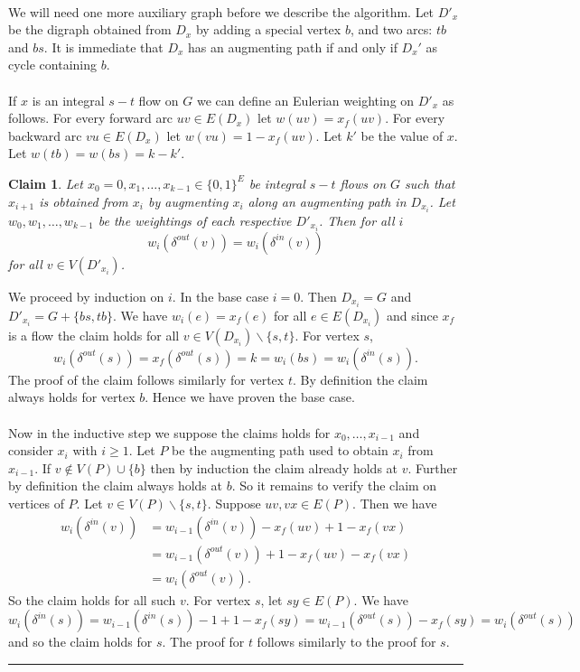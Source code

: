 \documentclass[letterpaper,12pt,oneside,onecolumn]{article}
\newenvironment{proof}{{\bf Proof:  }}{\hfill\rule{2mm}{2mm}}
\newtheorem{claim}[fact]{Claim}
\begin{document}
\paragraph{}
We will need one more auxiliary graph before we describe the algorithm. Let $D'_x$ be the digraph obtained from $D_x$ by adding a special vertex $b$, and two arcs: $tb$ and $bs$. It is immediate that $D_x$ has an augmenting path if and only if $D_x'$ as cycle containing $b$.
\paragraph{}
If $x$ is an integral $s-t$ flow on $G$ we can define an Eulerian weighting on $D'_x$ as follows. For every forward arc $uv \in E(D_x)$ let $w(uv) = x_f(uv)$. For every backward arc $vu \in E(D_x)$ let $w(vu) = 1- x_f(uv)$. Let $k'$ be the value of $x$. Let $w(tb) = w(bs) = k-k'$.
\begin{claim}
Let $x_0=0,x_1, \dots, x_{k-1}\in \{0,1\}^E$ be integral $s-t$ flows on $G$ such that $x_{i+1}$ is obtained from $x_i$ by augmenting $x_i$ along an augmenting path in $D_{x_i}$. Let $w_0,w_1,\dots, w_{k-1}$ be the weightings of each respective $D'_{x_i}$. Then for all $i$
$$w_i(\delta^{out}(v)) = w_i(\delta^{in}(v))$$ for all $v \in V(D'_{x_i})$.
\end{claim}
\begin{proof}
We proceed by induction on $i$. In the base case $i = 0$. Then $D_{x_i} = G$ and $D'_{x_i} = G + \{bs, tb\}$. We have $w_i(e) = x_f(e)$ for all $e \in E(D_{x_i})$ and since $x_f$ is a flow the claim holds for all $v \in V(D_{x_i})\backslash\{s,t\}$. For vertex $s$,
$$w_i(\delta^{out}(s)) = x_f(\delta^{out}(s)) = k = w_i(bs) = w_i(\delta^{in}(s)).$$
The proof of the claim follows similarly for vertex $t$. By definition the claim always holds for vertex $b$. Hence we have proven the base case.
\paragraph{}
Now in the inductive step we suppose the claims holds for $x_0, \dots, x_{i-1}$ and consider $x_i$ with $i \geq 1$. Let $P$ be the augmenting path used to obtain $x_i$ from $x_{i-1}$. If $v \not\in V(P) \cup \{b\}$ then by induction the claim already holds at $v$. Further by definition the claim always holds at $b$. So it remains to verify the claim on vertices of $P$. Let $v \in V(P)\backslash\{s,t\}$. Suppose $uv, vx \in E(P)$. Then we have
\begin{align*}
w_i(\delta^{in}(v)) &= w_{i-1}(\delta^{in}(v)) -x_f(uv) + 1-x_f(vx)\\
&=w_{i-1}(\delta^{out}(v)) + 1-x_f(uv) -x_f(vx) \\
&=w_i(\delta^{out}(v)).
\end{align*}
So the claim holds for all such $v$. For vertex $s$, let $sy \in E(P)$. We have
$$w_i(\delta^{in}(s)) = w_{i-1}(\delta^{in}(s)) -1 + 1-x_f(sy) = w_{i-1}(\delta^{out}(s)) -x_f(sy) = w_i(\delta^{out}(s))$$
and so the claim holds for $s$. The proof for $t$ follows similarly to the proof for $s$.
\end{proof}
\end{document}
